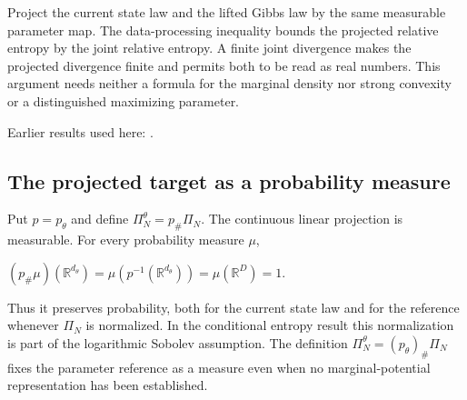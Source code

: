 \documentclass[11pt,a4paper]{report}
\begin{document}
Project the current state law and the lifted Gibbs law by the same measurable parameter map. The data-processing inequality bounds the projected relative entropy by the joint relative entropy. A finite joint divergence makes the projected divergence finite and permits both to be read as real numbers. This argument needs neither a formula for the marginal density nor strong convexity or a distinguished maximizing parameter.



Earlier results used here: \cite[Section~3.3]{LangevinLean2026IPLA}.
\subsection{\texorpdfstring{The projected target as a probability measure}{The projected target as a probability measure}}
\label{report-step-IPLA-LSI-Marginal-lean-1}


Put \(p=p_\theta\) and define \(\Pi_N^\theta=p_\#\Pi_N\). The continuous linear projection is measurable. For every probability measure \(\mu\),



\((p_\#\mu)(\mathbb R^{d_\theta})=\mu(p^{-1}(\mathbb R^{d_\theta}))=\mu(\mathbb R^D)=1\).



Thus it preserves probability, both for the current state law and for the reference whenever \(\Pi_N\) is normalized. In the conditional entropy result this normalization is part of the logarithmic Sobolev assumption. The definition \(\Pi_N^\theta=(p_\theta)_\#\Pi_N\) fixes the parameter reference as a measure even when no marginal-potential representation has been established.
\end{document}
